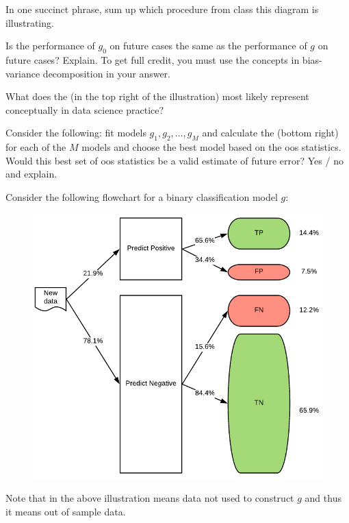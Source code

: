 \documentclass[12pt]{article}
\begin{document}
 In one succinct phrase, sum up which procedure from class this diagram is illustrating.

 Is the performance of $g_0$ on future cases the same as the performance of $g$ on future cases? Explain. To get full credit, you must use the concepts in bias-variance decomposition in your answer.

 What does the  (in the top right of the illustration) most likely represent conceptually in data science practice? 

 Consider the following: fit models $g_1, g_2, \ldots, g_M$ and calculate the  (bottom right) for each of the $M$ models and choose the best model based on the oos statistics. Would this best set of oos statistics be a valid estimate of future error? Yes / no and explain. 

\eenum


\problem Consider the following flowchart for a binary classification model $g$:\\

\begin{figure}[h]
\centering\includegraphics[width=5in]{classifier_flowchart}
\end{figure}

\noindent Note that  in the above illustration means data not used to construct $g$ and thus it means out of sample data.
\benum
\end{document}
